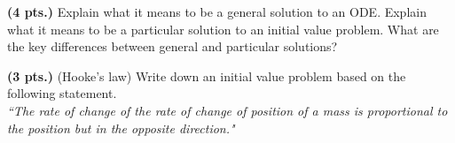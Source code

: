 \documentclass[12pt]{amsbook}
\begin{document}
\begin{problem}
    \textbf{(4 pts.)} Explain what it means to be a general solution to an ODE. Explain what it means to be a particular solution to an initial value problem.  What are the key differences between general and particular solutions?
\end{problem}

\begin{problem}
	\textbf{(3 pts.)} (Hooke's law) Write down an initial value problem based on the following statement.\\
	\emph{``The rate of change of the rate of change of position of a mass is proportional to the position but in the opposite direction."}
\end{problem}
\end{document}
